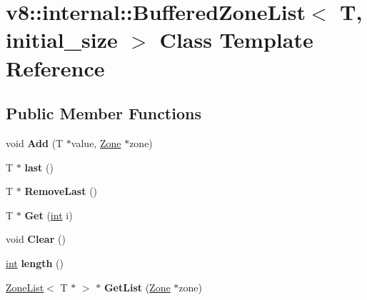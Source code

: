 \hypertarget{classv8_1_1internal_1_1BufferedZoneList}{}\section{v8\+:\+:internal\+:\+:Buffered\+Zone\+List$<$ T, initial\+\_\+size $>$ Class Template Reference}
\label{classv8_1_1internal_1_1BufferedZoneList}
\subsection*{Public Member Functions}
\begin{DoxyCompactItemize}
\item 
\mbox{\label{classv8_1_1internal_1_1BufferedZoneList_a3de4c84270cb42702572ced51d30d26f}} 
void {\bfseries Add} (T $\ast$value, \mbox{\hyperlink{classv8_1_1internal_1_1Zone}{Zone}} $\ast$zone)
\item 
\mbox{\label{classv8_1_1internal_1_1BufferedZoneList_acc8665e024d0570dfef2847261822236}} 
T $\ast$ {\bfseries last} ()
\item 
\mbox{\label{classv8_1_1internal_1_1BufferedZoneList_a1f06b478c7304885877438e715bf9305}} 
T $\ast$ {\bfseries Remove\+Last} ()
\item 
\mbox{\label{classv8_1_1internal_1_1BufferedZoneList_a3101d8115fdbd13dee7caa1d9bdcde63}} 
T $\ast$ {\bfseries Get} (\mbox{\hyperlink{classint}{int}} i)
\item 
\mbox{\label{classv8_1_1internal_1_1BufferedZoneList_aa6708f8a2bfc60b2e4fc53868519ff49}} 
void {\bfseries Clear} ()
\item 
\mbox{\label{classv8_1_1internal_1_1BufferedZoneList_ab563a66475d19eae0dbf063c3e3f928a}} 
\mbox{\hyperlink{classint}{int}} {\bfseries length} ()
\item 
\mbox{\label{classv8_1_1internal_1_1BufferedZoneList_a0b4985b4ddc528e77143003a03afabae}} 
\mbox{\hyperlink{classv8_1_1internal_1_1ZoneList}{Zone\+List}}$<$ T $\ast$ $>$ $\ast$ {\bfseries Get\+List} (\mbox{\hyperlink{classv8_1_1internal_1_1Zone}{Zone}} $\ast$zone)
\end{DoxyCompactItemize}


